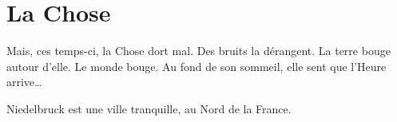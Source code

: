 \chapter{La Chose}
Mais, ces temps-ci, la Chose dort mal. Des bruits la dérangent. La terre bouge autour d'elle. Le monde bouge. Au fond de son
sommeil, elle sent que l'Heure arrive\ldots{}

Niedelbruck est une ville tranquille, au Nord de la France.

